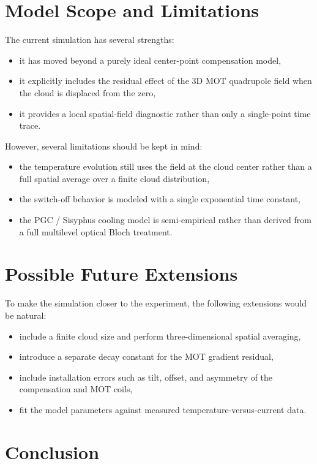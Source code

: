 \documentclass[12pt,a4paper]{article}
\begin{document}
\section{Model Scope and Limitations}

The current simulation has several strengths:
\begin{itemize}
  \item it has moved beyond a purely ideal center-point compensation model,
  \item it explicitly includes the residual effect of the 3D MOT quadrupole field when the cloud is displaced from the zero,
  \item it provides a local spatial-field diagnostic rather than only a single-point time trace.
\end{itemize}

However, several limitations should be kept in mind:
\begin{itemize}
  \item the temperature evolution still uses the field at the cloud center rather than a full spatial average over a finite cloud distribution,
  \item the switch-off behavior is modeled with a single exponential time constant,
  \item the PGC / Sisyphus cooling model is semi-empirical rather than derived from a full multilevel optical Bloch treatment.
\end{itemize}

\section{Possible Future Extensions}

To make the simulation closer to the experiment, the following extensions would be natural:
\begin{itemize}
  \item include a finite cloud size and perform three-dimensional spatial averaging,
  \item introduce a separate decay constant for the MOT gradient residual,
  \item include installation errors such as tilt, offset, and asymmetry of the compensation and MOT coils,
  \item fit the model parameters against measured temperature-versus-current data.
\end{itemize}

\section{Conclusion}
\end{document}
